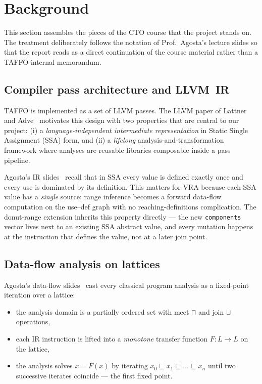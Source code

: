 \documentclass[11pt,a4paper]{article}
\theoremstyle{plain}
\begin{document}
\section{Background}
\label{sec:background}

This section assembles the pieces of the CTO course that the project
stands on. The treatment deliberately follows the notation of
Prof.\ Agosta's lecture slides so that the report reads as a direct
continuation of the course material rather than a TAFFO-internal
memorandum.

\subsection{Compiler pass architecture and LLVM~IR}

TAFFO is implemented as a set of LLVM passes. The LLVM paper of
Lattner and Adve~\cite{lattner-llvm} motivates this design with two
properties that are central to our project: (i) a
\emph{language-independent intermediate representation} in Static
Single Assignment (SSA) form, and (ii) a \emph{lifelong}
analysis-and-transformation framework where analyses are reusable
libraries composable inside a pass pipeline.

Agosta's IR slides~\cite{cot-ir} recall that in SSA every value is
defined exactly once and every use is dominated by its definition.
This matters for VRA because each SSA value has a \emph{single}
source: range inference becomes a forward data-flow computation on
the use--def graph with no reaching-definitions complication. The
donut-range extension inherits this property directly --- the new
\texttt{components} vector lives next to an existing SSA abstract
value, and every mutation happens at the instruction that defines the
value, not at a later join point.

\subsection{Data-flow analysis on lattices}
\label{sec:dataflow}

Agosta's data-flow slides~\cite{cot-dataflow} cast every classical
program analysis as a fixed-point iteration over a lattice:

\begin{itemize}
\item the analysis domain is a partially ordered set with meet $\sqcap$
      and join $\sqcup$ operations,
\item each IR instruction is lifted into a \emph{monotone} transfer
      function $F\colon L\to L$ on the lattice,
\item the analysis solves $x = F(x)$ by iterating
      $x_0 \sqsubseteq x_1 \sqsubseteq \dots \sqsubseteq x_n$ until two
      successive iterates coincide --- the first fixed point.
\end{itemize}
\end{document}
